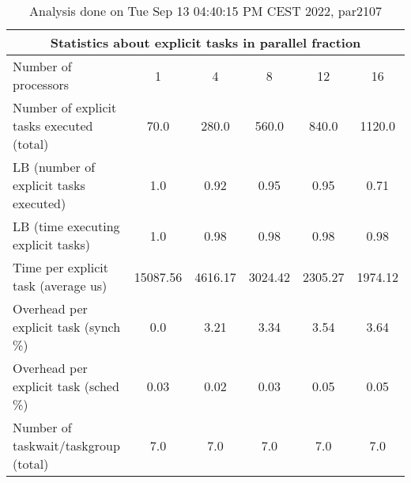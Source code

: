 \begin{table}[h]
\begin{center}
\begin{tabular}{|l|c|c|c|c|c|}
\hline
\multicolumn{6}{|c|}{Statistics about explicit tasks in parallel fraction} \\
\hline
\hline
Number of processors & 1 & 4 & 8 & 12 & 16 \\
\hline
\hline
Number of explicit tasks executed (total)        &            70.0 &           280.0 &           560.0 &           840.0 &          1120.0 \\
\hline
LB (number of explicit tasks executed)           &             1.0 &            0.92 &            0.95 &            0.95 &            0.71 \\
\hline
LB (time executing explicit tasks)               &             1.0 &            0.98 &            0.98 &            0.98 &            0.98 \\
\hline
Time per explicit task (average us)                 &        15087.56 &         4616.17 &         3024.42 &         2305.27 &         1974.12 \\
\hline
Overhead per explicit task (synch \%)             &             0.0 &            3.21 &            3.34 &            3.54 &            3.64 \\
\hline
Overhead per explicit task (sched \%)             &            0.03 &            0.02 &            0.03 &            0.05 &            0.05 \\
\hline
Number of taskwait/taskgroup (total)             &             7.0 &             7.0 &             7.0 &             7.0 &             7.0 \\
\hline
\end{tabular}
\end{center}
\caption{ Analysis done on Tue Sep 13 04:40:15 PM CEST 2022, par2107}
\end{table}
